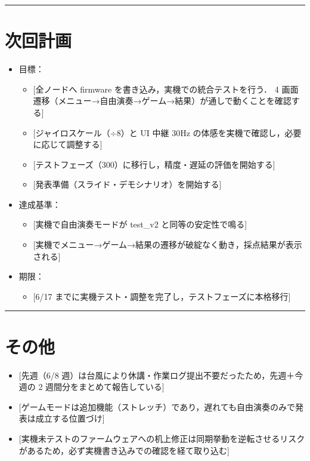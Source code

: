 \documentclass[uplatex,dvipdfmx,a4paper,11pt]{jsarticle}
\newcommand{\sectionrule}{\par\medskip\noindent\rule{\linewidth}{0.6pt}\par\medskip}
\begin{document}
\sectionrule

\section{次回計画}

\begin{itemize}
  \item 目標：
    \begin{itemize}
      \item {}[全ノードへ firmware を書き込み，実機での統合テストを行う．
            4 画面遷移（メニュー→自由演奏→ゲーム→結果）が通しで動くことを確認する]
      \item {}[ジャイロスケール（$\div$8）と UI 中継 30Hz の体感を実機で確認し，必要に応じて調整する]
      \item {}[テストフェーズ（300）に移行し，精度・遅延の評価を開始する]
      \item {}[発表準備（スライド・デモシナリオ）を開始する]
    \end{itemize}
  \item 達成基準：
    \begin{itemize}
      \item {}[実機で自由演奏モードが test\_v2 と同等の安定性で鳴る]
      \item {}[実機でメニュー→ゲーム→結果の遷移が破綻なく動き，採点結果が表示される]
    \end{itemize}
  \item 期限：
    \begin{itemize}
      \item {}[6/17 までに実機テスト・調整を完了し，テストフェーズに本格移行]
    \end{itemize}
\end{itemize}

\sectionrule

\section{その他}

\begin{itemize}
  \item {}[先週（6/8 週）は台風により休講・作業ログ提出不要だったため，先週＋今週の 2 週間分をまとめて報告している]
  \item {}[ゲームモードは追加機能（ストレッチ）であり，遅れても自由演奏のみで発表は成立する位置づけ]
  \item {}[実機未テストのファームウェアへの机上修正は同期挙動を逆転させるリスクがあるため，必ず実機書き込みでの確認を経て取り込む]
\end{itemize}
\end{document}
